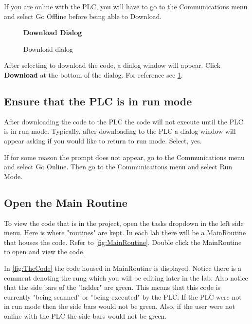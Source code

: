 If you are online with the PLC, you will have to go to the Communications menu and select Go Offline before being able to Download.

\begin{figure}[h]
\centering
\textbf{Download Dialog}\par \medskip
{}
\caption{Download dialog}
\label{fig:DownloadDialog}
\end{figure}

After selecting to download the code, a dialog window will appear. Click \textbf{Download} at the bottom of the dialog. For reference see \figureautorefname \ref{fig:DownloadDialog}.




\subsection{Ensure that the PLC is in run mode}

After downloading the code to the PLC the code will not execute until the PLC is in run mode. Typically, after downloading to the PLC a dialog window will appear asking if you would like to return to run mode. Select, yes.

If for some reason the prompt does not appear, go to the Communications menu and select Go Online. Then go to the Communicaitons menu and select Run Mode.

\subsection{Open the Main Routine}

To view the code that is in the project, open the tasks dropdown in the left side menu. Here is where "routines" are kept. In each lab there will be a MainRoutine that houses the code. Refer to \figureautorefname \ref{fig:MainRoutine}. Double click the MainRoutine to open and view the code.

In \figureautorefname \ref{fig:TheCode} the code housed in MainRoutine is displayed. Notice there is a comment denoting the rung which you will be editing later in the lab. Also notice that the side bars of the "ladder" are green. This means that this code is currently "being scanned" or "being executed" by the PLC. If the PLC were not in run mode then the side bars would not be green. Also, if the user were not online with the PLC the side bars would not be green. 

